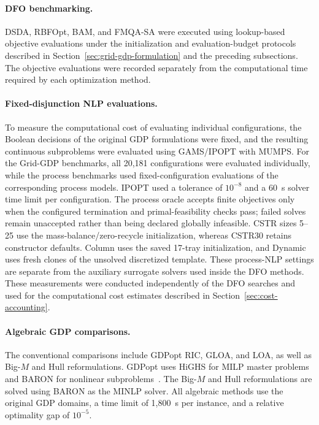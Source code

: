 \documentclass{article}
\begin{document}
\paragraph{DFO benchmarking.}
DSDA, RBFOpt, BAM, and FMQA-SA were executed using lookup-based objective evaluations under the initialization and evaluation-budget protocols described in Section~\ref{sec:grid-gdp-formulation} and the preceding subsections.
The objective evaluations were recorded separately from the computational time required by each optimization method.

\paragraph{Fixed-disjunction NLP evaluations.}
To measure the computational cost of evaluating individual configurations, the Boolean decisions of the original GDP formulations were fixed, and the resulting continuous subproblems were evaluated using GAMS/IPOPT with MUMPS.
For the Grid-GDP benchmarks, all 20,181 configurations were evaluated individually, while the process benchmarks used fixed-configuration evaluations of the corresponding process models.
IPOPT used a tolerance of \(10^{-8}\) and a 60~s solver time limit per configuration.
The process oracle accepts finite objectives only when the configured termination and primal-feasibility checks pass; failed solves remain unaccepted rather than being declared globally infeasible.
CSTR sizes 5--25 use the mass-balance/zero-recycle initialization, whereas CSTR30 retains constructor defaults. Column uses the saved 17-tray initialization, and Dynamic uses fresh clones of the unsolved discretized template.
These process-NLP settings are separate from the auxiliary surrogate solvers used inside the DFO methods.
These measurements were conducted independently of the DFO searches and used for the computational cost estimates described in Section~\ref{sec:cost-accounting}.

\paragraph{Algebraic GDP comparisons.}
The conventional comparisons include GDPopt RIC, GLOA, and LOA, as well as Big-\(M\) and Hull reformulations.
GDPopt uses HiGHS for MILP master problems and BARON for nonlinear subproblems~\cite{chen2022pyomogdp,pyomoGDPopt}.
The Big-\(M\) and Hull reformulations are solved using BARON as the MINLP solver.
All algebraic methods use the original GDP domains, a time limit of 1,800~s per instance, and a relative optimality gap of \(10^{-5}\).
\end{document}
